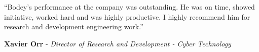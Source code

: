 \documentclass[10pt, a4paper]{report}
\begin{document}
\vspace{1em}

\hfill {\large ``Bodey's performance at the company was outstanding. He was on time, showed initiative, worked hard and was highly productive. I highly recommend him for research 
and development engineering work.''}

\hfill {\bf Xavier Orr} - {\em Director of Research and Development - Cyber Technology} \newline

\pagebreak

\setlength{\topmargin}{-1.5in}
\setlength{\oddsidemargin}{-1in}
\end{document}

